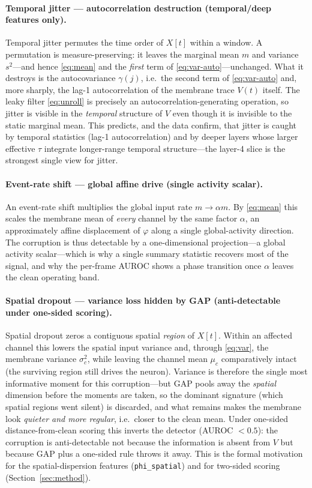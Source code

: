 \paragraph{Temporal jitter --- autocorrelation destruction (temporal/deep features only).}
Temporal jitter permutes the time order of $X[t]$ within a window. A permutation is
measure-preserving: it leaves the marginal mean $m$ and variance $s^2$---and hence
\eqref{eq:mean} and the \emph{first} term of \eqref{eq:var-auto}---unchanged. What it
destroys is the autocovariance $\gamma(j)$, i.e.\ the second term of \eqref{eq:var-auto} and,
more sharply, the lag-1 autocorrelation of the membrane trace $V(t)$ itself. The leaky filter
\eqref{eq:unroll} is precisely an autocorrelation-generating operation, so jitter is visible
in the \emph{temporal} structure of $V$ even though it is invisible to the static marginal
mean. This predicts, and the data confirm, that jitter is caught by temporal statistics
(lag-1 autocorrelation) and by deeper layers whose larger effective $\tau$ integrate
longer-range temporal structure---the layer-4 slice is the strongest single view for jitter.

\paragraph{Event-rate shift --- global affine drive (single activity scalar).}
An event-rate shift multiplies the global input rate $m \to \alpha m$. By \eqref{eq:mean}
this scales the membrane mean of \emph{every} channel by the same factor $\alpha$, an
approximately affine displacement of $\varphi$ along a single global-activity direction. The
corruption is thus detectable by a one-dimensional projection---a global activity
scalar---which is why a single summary statistic recovers most of the signal, and why the
per-frame AUROC shows a phase transition once $\alpha$ leaves the clean operating band.

\paragraph{Spatial dropout --- variance loss hidden by GAP (anti-detectable under one-sided
scoring).}
Spatial dropout zeros a contiguous spatial \emph{region} of $X[t]$. Within an affected
channel this lowers the spatial input variance and, through \eqref{eq:var}, the membrane
variance $\sigma_c^2$, while leaving the channel mean $\mu_c$ comparatively intact (the
surviving region still drives the neuron). Variance is therefore the single most informative
moment for this corruption---but GAP pools away the \emph{spatial} dimension before the
moments are taken, so the dominant signature (which spatial regions went silent) is
discarded, and what remains makes the membrane look \emph{quieter and more regular}, i.e.\
closer to the clean mean. Under one-sided distance-from-clean scoring this inverts the
detector (AUROC $< 0.5$): the corruption is anti-detectable not because the information is
absent from $V$ but because GAP plus a one-sided rule throws it away. This is the formal
motivation for the spatial-dispersion features (\texttt{phi\_spatial}) and for two-sided
scoring (Section~\ref{sec:method}).

